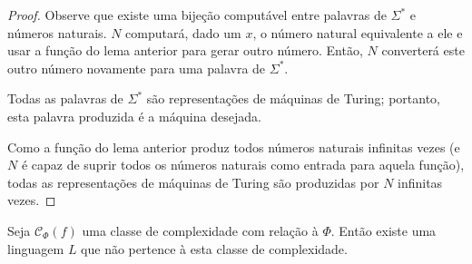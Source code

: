 \begin{proof}
    Observe que existe uma bijeção computável
    entre palavras de $\Sigma^*$
    e números naturais.
    $N$ computará,
    dado um $x$,
    o número natural equivalente a ele
    e usar a função do lema anterior
    para gerar outro número.
    Então, $N$ converterá este outro número
    novamente para uma palavra de $\Sigma^*$.

    Todas as palavras de $\Sigma^*$
    são representações de máquinas de Turing;
    portanto, esta palavra produzida é a máquina desejada.

    Como a função do lema anterior
    produz todos números naturais infinitas vezes
    (e $N$ é capaz de suprir todos os números naturais
    como entrada para aquela função),
    todas as representações de máquinas de Turing
    são produzidas por $N$ infinitas vezes.
\end{proof}

\begin{theorem}
    Seja $\mathcal C_\Phi(f)$ uma classe de complexidade
    com relação à $\Phi$.
    Então existe uma linguagem $L$
    que não pertence à esta classe de complexidade.
    \label{funcao_fora_classe}
\end{theorem}


